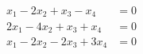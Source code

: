 \begin{align*}
x_1 - 2x_2 + x_3 - x_4 &= 0\\
2x_1 - 4x_2 + x_3 + x_4 &= 0\\
x_1 - 2x_2 - 2x_3 + 3x_4 &= 0
\end{align*}